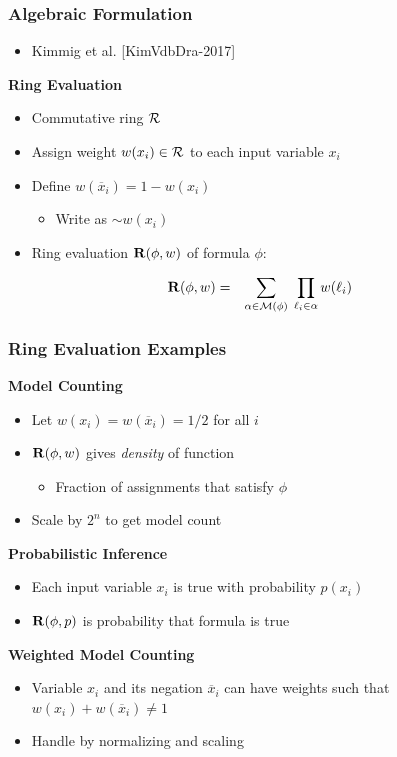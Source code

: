 \documentclass[t,pdf]{beamer}
\newcommand{\reference}[1]{{\footnotesize [#1]}}
\newcommand{\oneg}[1]{\overline{#1}}
\newcommand{\bitem}{\item[$\bullet$]}
\newcommand{\xnot}{\oneg{x}}
\newcommand{\pneg}{{\sim}}
\begin{document}
\begin{frame}

   \frametitle{Algebraic Formulation}
   \begin{itemize}
     \item Kimmig et al. \reference{KimVdbDra-2017}
   \end{itemize}

\medskip
{\bf Ring Evaluation}
\begin{itemize}
     \item Commutative ring ${\cal R}$ 
     \item Assign weight $w(x_i) \in {\cal R}$ to each input variable $x_i$
     \item Define $w(\xnot_i) = 1-w(x_i)$
       \begin{itemize}
         \bitem Write as $\pneg w(x_i)$
       \end{itemize}
     \item Ring evaluation ${\bf R}(\phi, w)$ of formula $\phi$:
   \end{itemize}
   \begin{eqnarray*}
     {\bf R}(\phi, w) & = & \sum_{\alpha \in {\cal M}(\phi)} \; \prod_{\ell_i \in \alpha} w(\ell_i)
   \end{eqnarray*}
\end{frame}

\begin{frame}
\frametitle{Ring Evaluation Examples}

\bigskip

{\bf Model Counting}
\begin{itemize}
\item Let $w(x_i) = w(\oneg{x}_i) = 1/2$ for all $i$
\item ${\bf R}(\phi, w)$ gives {\em density} of function
  \begin{itemize}
    \bitem Fraction of assignments that satisfy $\phi$
  \end{itemize}
\item Scale by $2^n$ to get model count
\end{itemize}

\medskip

{\bf Probabilistic Inference}
\begin{itemize}
\item Each input variable $x_i$ is true with probability $p(x_i)$
\item ${\bf R}(\phi, p)$ is probability that formula is true
\end{itemize}

\medskip

{\bf Weighted Model Counting}
\begin{itemize}
\item Variable $x_i$ and its negation $\oneg{x}_i$ can have weights such that $w(x_i) + w(\oneg{x}_i) \not = 1$
\item Handle by normalizing and scaling  
\end{itemize}

\end{frame}
\end{document}
